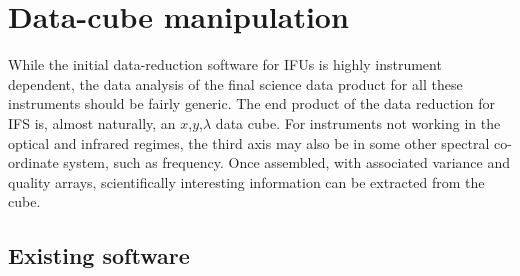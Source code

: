 \documentclass[twoside,11pt]{article}
\newcommand{\xlabel}[1]{}
\begin{document}
\newpage
\section{\xlabel{sc16_datacube}Data-cube manipulation\label{sc16_datacube}}

While the initial data-reduction software for IFUs is highly
instrument dependent, the data analysis of the final science data
product for all these instruments should be fairly generic.  The end
product of the data reduction for IFS is, almost naturally, an
$x$,$y$,$\lambda$ data cube.  For instruments not working in the
optical and infrared regimes, the third axis may also be in some other
spectral co-ordinate system, such as frequency.  Once assembled, with
associated variance and quality arrays, scientifically interesting
information can be extracted from the cube.

\subsection{\xlabel{sc16_exist}Existing software\label{sc16_exist}}
\end{document}
